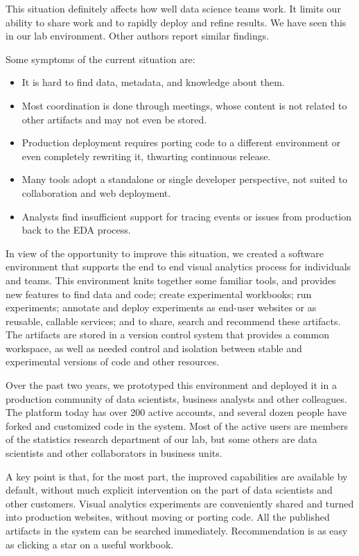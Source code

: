 This situation definitely affects how well data science teams work.
It limits our ability to share work and to rapidly deploy and refine results.
We have seen this in our lab environment.
Other authors report similar findings.

Some symptoms of the current situation are:
\begin{itemize}
\item It is hard to find data, metadata, and knowledge about them.
\item Most coordination is done through meetings, whose content is not related to other artifacts and may not even be stored.
\item Production deployment requires porting code to a different environment or even completely rewriting it, thwarting continuous release.
\item Many tools adopt a standalone or single developer perspective,
not suited to collaboration and web deployment. 
\item Analysts find insufficient support for tracing events or issues from production back to the EDA process.
\end{itemize}

In view of the opportunity to improve this situation,
we created a software environment that supports the end to end
visual analytics process for individuals and teams.
This environment knits together some familiar tools, and 
provides new features to find data and code; create experimental workbooks;
run experiments; annotate and deploy experiments as end-user websites or
as reusable, callable services; and to share, search and recommend these artifacts. The artifacts are stored in a version
control system that provides a common workspace, as well as needed control
and isolation between stable and experimental versions of code and other
resources. 

Over the past two years, we prototyped this environment and deployed it
in a production community of data scientists, business analysts and other colleagues.
The platform today has over 200 active accounts, and several dozen people have forked
and customized code in the system. Most of the active users are members of
the statistics research department of our lab, but some others are data
scientists and other collaborators in business units. 

A key point is that, for the most part, the improved capabilities are
available by default, without much explicit intervention on the part of
data scientists and other customers. Visual analytics experiments are
conveniently shared and turned into production websites, without moving
or porting code. All the published artifacts in the system can be
searched immediately. Recommendation is as easy as clicking a star
on a useful workbook.

